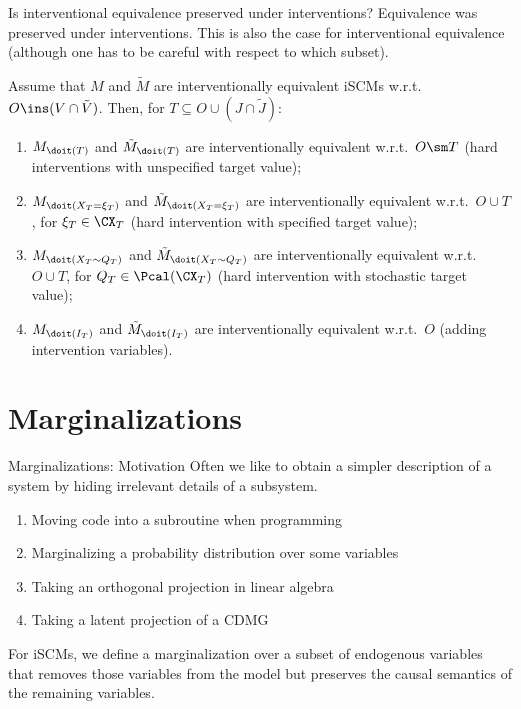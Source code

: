 \begin{frame}{Is interventional equivalence preserved under interventions?}
Equivalence was preserved under interventions. 
This is also the case for interventional equivalence (although one has to be careful with respect to which subset).
\begin{Prp}[\ref{prp:scm_interventions_preserve_interv_equiv}]
  Assume that $M$ and $\tilde{M}$ are interventionally equivalent iSCMs w.r.t.\ $O \ins (V \cap \tilde{V})$. Then, for $T \subseteq O \cup (J \cap \tilde{J})$:
    \begin{enumerate}
      \item $M_{\doit(T)}$ and $\tilde{M}_{\doit(T)}$ are interventionally equivalent w.r.t.\ $O \sm T$ (hard interventions with unspecified target value);
      \item $M_{\doit(X_T=\xi_T)}$ and $\tilde{M}_{\doit(X_T=\xi_T)}$ are interventionally equivalent w.r.t.\ $O \cup T$, for $\xi_T \in \CX_T$ (hard intervention with specified target value);
      \item $M_{\doit(X_T\sim Q_T)}$ and $\tilde{M}_{\doit(X_T\sim Q_T)}$ are interventionally equivalent w.r.t.\ $O \cup T$, for $Q_T \in \Pcal(\CX_T)$ (hard intervention with stochastic target value);
      \item $M_{\doit(I_T)}$ and $\tilde{M}_{\doit(I_T)}$ are interventionally equivalent w.r.t.\ $O$ (adding intervention variables).
    \end{enumerate}
\end{Prp}
\end{frame}

\part{Marginalizations}
\frame{\partpage}

\begin{frame}{Marginalizations: Motivation}
  Often we like to obtain a simpler description of a system by hiding irrelevant details of a subsystem.

  \begin{Eg}
    \begin{enumerate}
      \item Moving code into a subroutine when programming
      \item Marginalizing a probability distribution over some variables
      \item Taking an orthogonal projection in linear algebra
      \item Taking a latent projection of a CDMG
    \end{enumerate}
  \end{Eg}

  For iSCMs, we define a marginalization over a subset of endogenous variables that removes those
  variables from the model but preserves the causal semantics of the remaining variables.
\end{frame}

